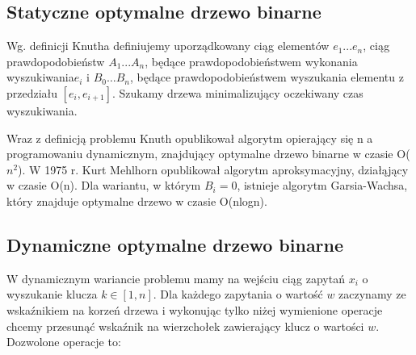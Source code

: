 \documentclass[declaration,shortabstract]{iithesis}
\theoremstyle{remark}
\theoremstyle{plain}
\theoremstyle{plain}
\theoremstyle{plain}
\begin{document}
\subsection{Statyczne optymalne drzewo binarne}  

Wg. definicji Knutha definiujemy uporządkowany ciąg elementów \(e_1...e_n\), ciąg prawdopodobieństw \(A_1...A_n\), będące prawdopodobieństwem wykonania wyszukiwania\(e_i\) i  \(B_0 … B_n\), będące prawdopodobieństwem wyszukania elementu z przedziału \([e_i, e_{i+1}]\). Szukamy drzewa minimalizujący oczekiwany czas wyszukiwania.  

Wraz z definicją problemu Knuth opublikował algorytm opierający się n a programowaniu dynamicznym, znajdujący optymalne drzewo binarne w czasie O(\(n^2\)). W 1975 r. Kurt Mehlhorn opublikował algorytm aproksymacyjny, działąjący w czasie O(n). Dla wariantu, w którym \(B_i = 0\), istnieje algorytm Garsia-Wachsa, który znajduje optymalne drzewo w czasie O(nlogn).  

\subsection{Dynamiczne optymalne drzewo binarne}  

W dynamicznym wariancie problemu mamy na wejściu ciąg zapytań \(x_i\) o wyszukanie klucza \(k \in [1, n]\). Dla każdego zapytania o wartość \(w\) zaczynamy ze wskaźnikiem na korzeń drzewa i wykonując tylko niżej wymienione operacje chcemy przesunąć wskaźnik na wierzchołek zawierający klucz o wartości \(w\). Dozwolone operacje to:  
\end{document}
